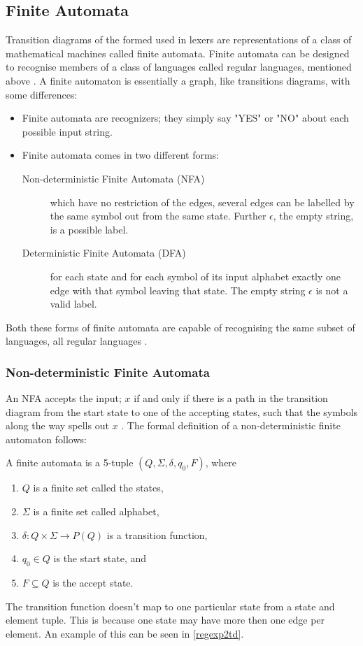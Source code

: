 \subsection{Finite Automata}
Transition diagrams of the formed used in lexers are representations of a class 
of mathematical machines called finite automata. Finite automata can be 
designed to recognise members of a class of languages called regular languages, 
mentioned above \cite{sebesta2012}.
A finite automaton is essentially a graph, like transitions diagrams, with some 
differences:
\begin{itemize}
  \item Finite automata are recognizers; they simply say "YES" or "NO" about 
each possible input string.
  \item Finite automata comes in two different forms:
    \begin{description}
      \item [Non-deterministic Finite Automata (NFA)] which have no restriction 
of the edges, several edges can be labelled by the same symbol out from the 
same state. Further $\epsilon$, the empty string, is a possible label. 
      \item [Deterministic Finite Automata (DFA)] for each state and for each 
symbol of its input alphabet exactly one edge with that symbol leaving that 
state. The empty string $\epsilon$ is not a valid label.
    \end{description}
\end{itemize}
Both these forms of finite automata are capable of recognising the same 
subset of languages, all regular languages \cite{Aho2006}.

\subsubsection{Non-deterministic Finite Automata}
An NFA accepts the input; $x$ if and only if there is a path in the transition 
diagram from the start state to one of the accepting states, such that the 
symbols along the way spells out $x$ \cite{Aho2006}.
The formal definition of a non-deterministic finite automaton follows:
\begin{definition} \label{finiteAutomataDef}
A finite automata is a 5-tuple $(Q, \Sigma, \delta, q_0, F)$, where
\begin{enumerate}
  \item $Q$ is a finite set called the states,
  \item $\Sigma$ is a finite set called alphabet,
  \item $\delta: Q \times \Sigma \to P(Q)$ is a transition function,
  \item $q_0 \in Q$ is the start state, and
  \item $F \subseteq Q$ is the accept state.
\end{enumerate} 
\end{definition}
The transition function doesn't map to one particular state from a
state and element tuple. This is because one state may have more then one edge
per element. An example of this can be seen in \cref{regexp2td}.

